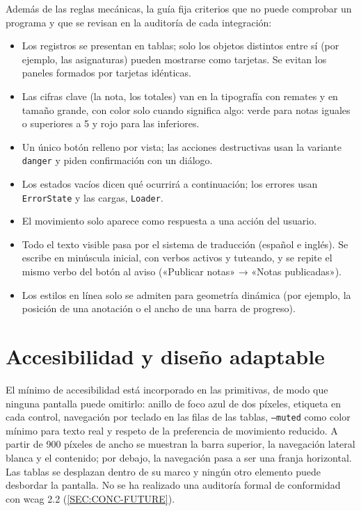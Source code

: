 Además de las reglas mecánicas, la guía fija criterios que no puede comprobar un
programa y que se revisan en la auditoría de cada integración:
\begin{itemize}
  \item Los registros se presentan en tablas; solo los objetos distintos entre sí
        (por ejemplo, las asignaturas) pueden mostrarse como tarjetas. Se evitan los
        paneles formados por tarjetas idénticas.
  \item Las cifras clave (la nota, los totales) van en la tipografía con remates y
        en tamaño grande, con color solo cuando significa algo: verde para notas
        iguales o superiores a 5 y rojo para las inferiores.
  \item Un único botón relleno por vista; las acciones destructivas usan la
        variante \texttt{danger} y piden confirmación con un diálogo.
  \item Los estados vacíos dicen qué ocurrirá a continuación; los errores usan
        \texttt{ErrorState} y las cargas, \texttt{Loader}.
  \item El movimiento solo aparece como respuesta a una acción del usuario.
  \item Todo el texto visible pasa por el sistema de traducción (español e
        inglés). Se escribe en minúscula inicial, con verbos activos y tuteando, y
        se repite el mismo verbo del botón al aviso («Publicar notas» → «Notas
        publicadas»).
  \item Los estilos en línea solo se admiten para geometría dinámica (por ejemplo,
        la posición de una anotación o el ancho de una barra de progreso).
\end{itemize}

\section*{Accesibilidad y diseño adaptable}

El mínimo de accesibilidad está incorporado en las primitivas, de modo que ninguna
pantalla puede omitirlo: anillo de foco azul de dos píxeles, etiqueta en cada
control, navegación por teclado en las filas de las tablas, \texttt{--muted} como
color mínimo para texto real y respeto de la preferencia de movimiento reducido. A
partir de 900 píxeles de ancho se muestran la barra superior, la navegación lateral
blanca y el contenido; por debajo, la navegación pasa a ser una franja horizontal.
Las tablas se desplazan dentro de su marco y ningún otro elemento puede desbordar
la pantalla. No se ha realizado una auditoría formal de conformidad con
\acs{wcag} 2.2 (\cref{SEC:CONC-FUTURE}).

